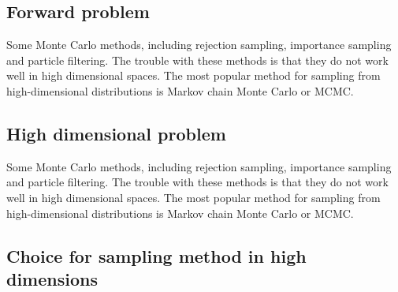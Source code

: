 \subsection{Forward problem}

Some Monte Carlo methods, including rejection sampling, importance sampling and particle filtering. The trouble with these methods is that they do not work well in high
dimensional spaces. The most popular method for sampling from high-dimensional distributions
is Markov chain Monte Carlo or MCMC.
\subsection{High dimensional problem}

Some Monte Carlo methods, including rejection sampling, importance sampling and particle filtering. The trouble with these methods is that they do not work well in high
dimensional spaces. The most popular method for sampling from high-dimensional distributions
is Markov chain Monte Carlo or MCMC.


\subsection{Choice for sampling method in high dimensions}